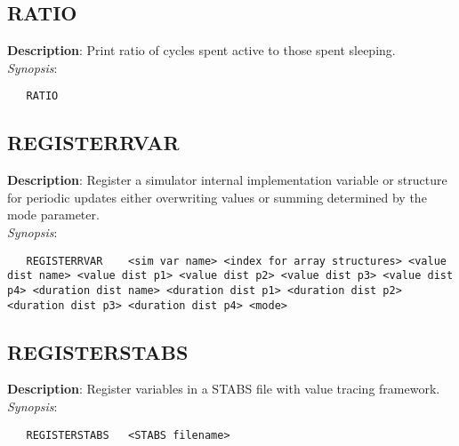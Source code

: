 \subsection{\bf RATIO}
\label{manpages:RATIO}
\label{manpages:ratio}
\vspace{-0.2in}
{\bf Description}: 	Print ratio of cycles spent active to those spent sleeping.\\[1.5ex]
{\em Synopsis}:
\vspace{-0.2in}
\scriptsize
\begin{verbatim}
   RATIO   	
\end{verbatim}
\normalsize
\vspace{-0.2in}


\subsection{\bf REGISTERRVAR}
\label{manpages:REGISTERRVAR}
\label{manpages:registerrvar}
\vspace{-0.2in}
{\bf Description}: 	Register a simulator internal implementation variable or structure for periodic updates either overwriting values or summing determined by the mode parameter.\\[1.5ex]
{\em Synopsis}:
\vspace{-0.2in}
\scriptsize
\begin{verbatim}
   REGISTERRVAR    <sim var name> <index for array structures> <value dist name> <value dist p1> <value dist p2> <value dist p3> <value dist p4> <duration dist name> <duration dist p1> <duration dist p2> <duration dist p3> <duration dist p4> <mode>	
\end{verbatim}
\normalsize
\vspace{-0.2in}


\subsection{\bf REGISTERSTABS}
\label{manpages:REGISTERSTABS}
\label{manpages:registerstabs}
\vspace{-0.2in}
{\bf Description}: 	Register variables in a STABS file with value tracing framework.\\[1.5ex]
{\em Synopsis}:
\vspace{-0.2in}
\scriptsize
\begin{verbatim}
   REGISTERSTABS   <STABS filename>	
\end{verbatim}
\normalsize
\vspace{-0.2in}


